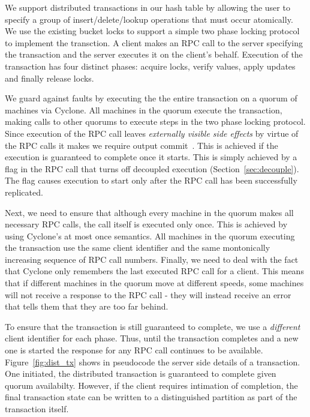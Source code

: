 \documentclass[letterpaper,twocolumn,10pt]{article}
\begin{document}
We support distributed transactions in our hash table by allowing the user to
specify a group of insert/delete/lookup operations that must occur
atomically. We use the existing bucket locks to support a simple two phase
locking protocol to implement the transction. A client makes an RPC call to the
server specifying the transaction and the server executes it on the client's
behalf. Execution of the transaction has four distinct phases: acquire locks,
verify values, apply updates and finally release locks.

We guard against faults by executing the the entire transaction on a quorum of
machines via Cyclone. All machines in the quorum execute the transaction, making
calls to other quorums to execute steps in the two phase locking protocol. Since
execution of the RPC call leaves \emph{externally visible side effects} by
virtue of the RPC calls it makes we require output
commit~\cite{output_commit}. This is achieved if the execution is guaranteed to
complete once it starts. This is simply achieved by a flag in the RPC call that
turns off decoupled execution (Section~\ref{sec:decouple}). The flag causes
execution to start only after the RPC call has been successfully replicated.

Next, we need to ensure that although every machine in the quorum makes all
necessary RPC calls, the call itself is executed only once. This is achieved by
using Cyclone's at most once semantics. All machines in the quorum executing the
transaction use the same client identifier and the same montonically increasing
sequence of RPC call numbers. Finally, we need to deal with the fact that
Cyclone only remembers the last executed RPC call for a client. This means that
if different machines in the quorum move at different speeds, some machines will
not receive a response to the RPC call - they will instead receive an error that
tells them that they are too far behind.

To ensure that the transaction is still guaranteed to complete, we use a
\emph{different} client identifier for each phase. Thus, until the transaction
completes and a new one is started the response for any RPC call continues to be
available. Figure~\ref{fig:dist_tx} shows in pseudocode the server side details
of a transaction. One initiated, the distributed transaction is guaranteed to
complete given quorum availabilty. However, if the client requires intimation of
completion, the final transaction state can be written to a distinguished
partition as part of the transaction itself.
\end{document}
